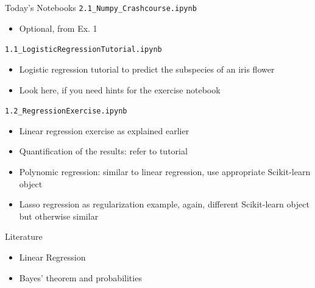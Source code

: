 \documentclass[
                en,
                ]{sdqbeamer}
\begin{document}
\begin{frame}{Today's Notebooks}
    \texttt{2.1\_Numpy\_Crashcourse.ipynb}
    \begin{itemize}
        \item Optional, from Ex. 1
    \end{itemize}
    \vfill
    \texttt{1.1\_LogisticRegressionTutorial.ipynb}
    \begin{itemize}
        \item Logistic regression tutorial to predict the subspecies of an iris flower
        \item Look here, if you need hints for the exercise notebook
    \end{itemize}
    \vfill
    \texttt{1.2\_RegressionExercise.ipynb}
    \begin{itemize}
        \item Linear regression exercise as explained earlier
        \item Quantification of the results: refer to tutorial
        \item Polynomic regression: similar to linear regression, use
            appropriate Scikit-learn object
        \item Lasso regression as regularization example, again, different
            Scikit-learn object but otherwise similar
    \end{itemize}
\end{frame}

\appendix
\beginbackup

\begin{frame}{Literature}
    \begin{itemize}
        \setlength\itemsep{2em}
        \item Linear Regression~\nocite{Hastie-2009}
            \printbibliography[keyword={hastie},title={Linear Regression}]
        \item Bayes' theorem and probabilities~\nocite{wikipedia-bayes-en,
            wikipedia-bayes-de}
            \printbibliography[keyword={bayes}, title={Bayes' theorem and
            probabilities}]
    \end{itemize}
\end{frame}

\backupend
\end{document}
